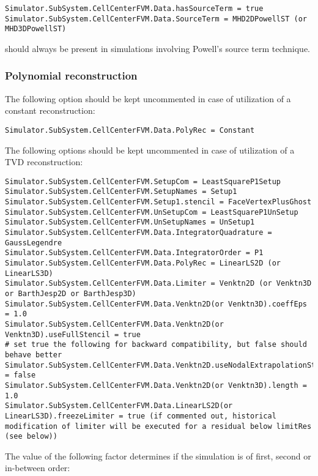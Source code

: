 \documentclass[11pt]{article}
\begin{document}
\begin{lstlisting}[breaklines]
Simulator.SubSystem.CellCenterFVM.Data.hasSourceTerm = true
Simulator.SubSystem.CellCenterFVM.Data.SourceTerm = MHD2DPowellST (or MHD3DPowellST) 
\end{lstlisting}
should always be present in simulations involving Powell's source term technique.

\subsubsection{Polynomial reconstruction}

The following option should be kept uncommented in case of utilization of a constant reconstruction:

\begin{lstlisting}[breaklines]
Simulator.SubSystem.CellCenterFVM.Data.PolyRec = Constant
\end{lstlisting}

The following options should be kept uncommented in case of utilization of a TVD reconstruction:

\begin{lstlisting}[breaklines]
Simulator.SubSystem.CellCenterFVM.SetupCom = LeastSquareP1Setup
Simulator.SubSystem.CellCenterFVM.SetupNames = Setup1
Simulator.SubSystem.CellCenterFVM.Setup1.stencil = FaceVertexPlusGhost
Simulator.SubSystem.CellCenterFVM.UnSetupCom = LeastSquareP1UnSetup
Simulator.SubSystem.CellCenterFVM.UnSetupNames = UnSetup1
Simulator.SubSystem.CellCenterFVM.Data.IntegratorQuadrature = GaussLegendre
Simulator.SubSystem.CellCenterFVM.Data.IntegratorOrder = P1
Simulator.SubSystem.CellCenterFVM.Data.PolyRec = LinearLS2D (or LinearLS3D)
Simulator.SubSystem.CellCenterFVM.Data.Limiter = Venktn2D (or Venktn3D or BarthJesp2D or BarthJesp3D)
Simulator.SubSystem.CellCenterFVM.Data.Venktn2D(or Venktn3D).coeffEps = 1.0
Simulator.SubSystem.CellCenterFVM.Data.Venktn2D(or Venktn3D).useFullStencil = true
# set true the following for backward compatibility, but false should behave better
Simulator.SubSystem.CellCenterFVM.Data.Venktn2D.useNodalExtrapolationStencil = false
Simulator.SubSystem.CellCenterFVM.Data.Venktn2D(or Venktn3D).length = 1.0
Simulator.SubSystem.CellCenterFVM.Data.LinearLS2D(or LinearLS3D).freezeLimiter = true (if commented out, historical modification of limiter will be executed for a residual below limitRes (see below))
\end{lstlisting}

The value of the following factor determines if the simulation is of first, second or in-between order:
\end{document}
